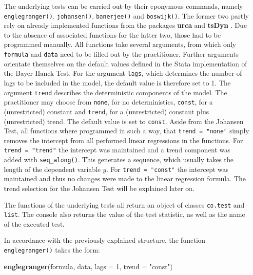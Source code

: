 \documentclass[12pt,a4paper]{article}
\newenvironment{Shaded}{\begin{snugshade}}{\end{snugshade}}
\newcommand{\DataTypeTok}[1]{\textcolor[rgb]{0.13,0.29,0.53}{#1}}
\newcommand{\DecValTok}[1]{\textcolor[rgb]{0.00,0.00,0.81}{#1}}
\newcommand{\KeywordTok}[1]{\textcolor[rgb]{0.13,0.29,0.53}{\textbf{#1}}}
\newcommand{\NormalTok}[1]{#1}
\newcommand{\StringTok}[1]{\textcolor[rgb]{0.31,0.60,0.02}{#1}}
\begin{document}
The underlying tests can be carried out by their eponymous commands,
namely \texttt{englegranger()}, \texttt{johansen()}, \texttt{banerjee()}
and \texttt{boswijk()}. The former two partly rely on already
implemented functions from the packages \textbf{urca}
\autocite{pfaff_urca_2020} and \textbf{tsDyn}
\autocite{stigler_tsdyn_2020}. Due to the absence of associated
functions for the latter two, those had to be programmed manually. All
functions take several arguments, from which only \texttt{formula} and
\texttt{data} need to be filled out by the practitioner. Further
arguments orientate themselves on the default values defined in the
Stata implementation of the Bayer-Hanck Test. For the argument
\texttt{lags}, which determines the number of lags to be included in the
model, the default value is therefore set to 1. The argument
\texttt{trend} describes the deterministic components of the model. The
practitioner may choose from \texttt{none}, for no deterministics,
\texttt{const}, for a (unrestricted) constant and \texttt{trend}, for a
(unrestricted) constant plus (unrestricted) trend. The default value is
set to \texttt{const}. Aside from the Johansen Test, all functions where
programmed in such a way, that \texttt{trend\ =\ "none"} simply removes
the intercept from all performed linear regressions in the functions.
For \texttt{trend\ =\ "trend"} the intercept was maintained and a trend
component was added with \texttt{seq\_along()}. This generates a
sequence, which usually takes the length of the dependent variable
\(y\). For \texttt{trend\ =\ "const"} the intercept was maintained and
thus no changes were made to the linear regression formula. The trend
selection for the Johansen Test will be explained later on.

The functions of the underlying tests all return an object of classes
\texttt{co.test} and \texttt{list}. The console also returns the value
of the test statistic, as well as the name of the executed test.

In accordance with the previously explained structure, the function
\texttt{englegranger()} takes the form:

\begin{Shaded}
\begin{Highlighting}[]
\KeywordTok{englegranger}\NormalTok{(formula, data, }\DataTypeTok{lags =} \DecValTok{1}\NormalTok{, }\DataTypeTok{trend =} \StringTok{"const"}\NormalTok{)}
\end{Highlighting}
\end{Shaded}
\end{document}
